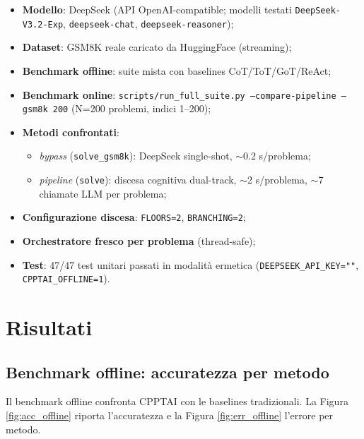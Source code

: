 \documentclass[11pt,a4paper]{article}
\begin{document}
\begin{itemize}[leftmargin=1.2em]
  \item \textbf{Modello}: DeepSeek (API OpenAI-compatible; modelli testati
        \texttt{DeepSeek-V3.2-Exp}, \texttt{deepseek-chat}, \texttt{deepseek-reasoner});
  \item \textbf{Dataset}: GSM8K reale caricato da HuggingFace (streaming);
  \item \textbf{Benchmark offline}: suite mista con baselines CoT/ToT/GoT/ReAct;
  \item \textbf{Benchmark online}: \texttt{scripts/run\_full\_suite.py --compare-pipeline
        --gsm8k 200} (N=200 problemi, indici 1--200);
  \item \textbf{Metodi confrontati}:
    \begin{itemize}[leftmargin=1.2em]
      \item \emph{bypass} (\texttt{solve\_gsm8k}): DeepSeek single-shot, $\sim$0.2 s/problema;
      \item \emph{pipeline} (\texttt{solve}): discesa cognitiva dual-track,
            $\sim$2 s/problema, $\sim$7 chiamate LLM per problema;
    \end{itemize}
  \item \textbf{Configurazione discesa}: \texttt{FLOORS=2}, \texttt{BRANCHING=2};
  \item \textbf{Orchestratore fresco per problema} (thread-safe);
  \item \textbf{Test}: 47/47 test unitari passati in modalità ermetica
        (\texttt{DEEPSEEK\_API\_KEY=""}, \texttt{CPPTAI\_OFFLINE=1}).
\end{itemize}

\section{Risultati}
\label{sec:risultati}

\subsection{Benchmark offline: accuratezza per metodo}

Il benchmark offline confronta CPPTAI con le baselines tradizionali. La Figura
\ref{fig:acc_offline} riporta l'accuratezza e la Figura \ref{fig:err_offline}
l'errore per metodo.
\end{document}
